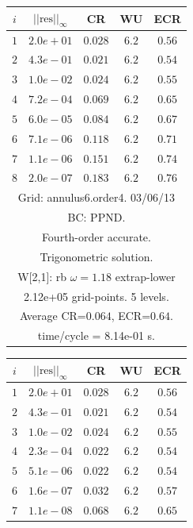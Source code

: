 \begin{table}[hbt]
\begin{center}
{\begin{tabular}{|c|c|c|c|c|} \hline 
 $i$   & $\vert\vert\mbox{res}\vert\vert_\infty$  &  CR     &  WU    & ECR  \\   \hline 
 $ 1$  & $ 2.0e+01$ & $0.028$ & $ 6.2$ & $0.56$ \\ 
 $ 2$  & $ 4.3e-01$ & $0.021$ & $ 6.2$ & $0.54$ \\ 
 $ 3$  & $ 1.0e-02$ & $0.024$ & $ 6.2$ & $0.55$ \\ 
 $ 4$  & $ 7.2e-04$ & $0.069$ & $ 6.2$ & $0.65$ \\ 
 $ 5$  & $ 6.0e-05$ & $0.084$ & $ 6.2$ & $0.67$ \\ 
 $ 6$  & $ 7.1e-06$ & $0.118$ & $ 6.2$ & $0.71$ \\ 
 $ 7$  & $ 1.1e-06$ & $0.151$ & $ 6.2$ & $0.74$ \\ 
 $ 8$  & $ 2.0e-07$ & $0.183$ & $ 6.2$ & $0.76$ \\ 
\hline 
\multicolumn{5}{|c|}{Grid: annulus6.order4. 03/06/13}  \\
\multicolumn{5}{|c|}{BC: PPND.}  \\
\multicolumn{5}{|c|}{Fourth-order accurate.}  \\
\multicolumn{5}{|c|}{Trigonometric solution.}  \\
\multicolumn{5}{|c|}{W[2,1]: rb $\omega=1.18$ extrap-lower}  \\
\multicolumn{5}{|c|}{2.12e+05 grid-points. 5 levels.}  \\
\multicolumn{5}{|c|}{Average CR=$0.064$, ECR=$0.64$.}  \\
\multicolumn{5}{|c|}{time/cycle = 8.14e-01 s.}  \\
\hline 
\end{tabular}
\begin{tabular}{|c|c|c|c|c|} \hline 
 $i$   & $\vert\vert\mbox{res}\vert\vert_\infty$  &  CR     &  WU    & ECR  \\   \hline 
 $ 1$  & $ 2.0e+01$ & $0.028$ & $ 6.2$ & $0.56$ \\ 
 $ 2$  & $ 4.3e-01$ & $0.021$ & $ 6.2$ & $0.54$ \\ 
 $ 3$  & $ 1.0e-02$ & $0.024$ & $ 6.2$ & $0.55$ \\ 
 $ 4$  & $ 2.3e-04$ & $0.022$ & $ 6.2$ & $0.54$ \\ 
 $ 5$  & $ 5.1e-06$ & $0.022$ & $ 6.2$ & $0.54$ \\ 
 $ 6$  & $ 1.6e-07$ & $0.032$ & $ 6.2$ & $0.57$ \\ 
 $ 7$  & $ 1.1e-08$ & $0.068$ & $ 6.2$ & $0.65$ \\ 

\end{tabular}}
\end{center}
\end{table}
